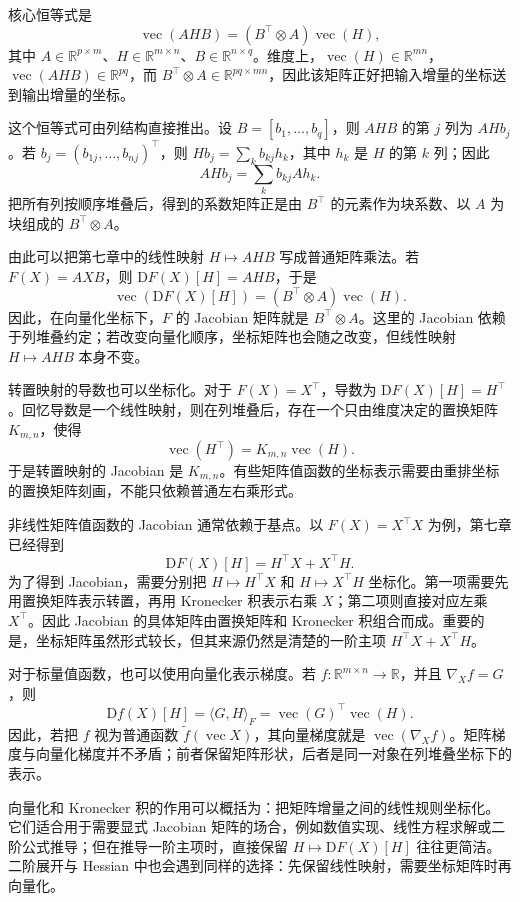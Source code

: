 核心恒等式是
\[
\operatorname{vec}(A H B)=(B^\top\otimes A)\operatorname{vec}(H),
\]
其中 \(A\in\mathbb{R}^{p\times m}\)、\(H\in\mathbb{R}^{m\times n}\)、\(B\in\mathbb{R}^{n\times q}\)。维度上，\(\operatorname{vec}(H)\in\mathbb{R}^{mn}\)，\(\operatorname{vec}(AHB)\in\mathbb{R}^{pq}\)，而 \(B^\top\otimes A\in\mathbb{R}^{pq\times mn}\)，因此该矩阵正好把输入增量的坐标送到输出增量的坐标。

这个恒等式可由列结构直接推出。设 \(B=[b_1,\ldots,b_q]\)，则 \(AHB\) 的第 \(j\) 列为 \(AHb_j\)。若 \(b_j=(b_{1j},\ldots,b_{nj})^\top\)，则 \(Hb_j=\sum_k b_{kj}h_k\)，其中 \(h_k\) 是 \(H\) 的第 \(k\) 列；因此
\[
AHb_j=\sum_k b_{kj}A h_k.
\]
把所有列按顺序堆叠后，得到的系数矩阵正是由 \(B^\top\) 的元素作为块系数、以 \(A\) 为块组成的 \(B^\top\otimes A\)。

由此可以把第七章中的线性映射 \(H\mapsto AHB\) 写成普通矩阵乘法。若 \(F(X)=AXB\)，则 \(\mathrm{D}F(X)[H]=AHB\)，于是
\[
\operatorname{vec}(\mathrm{D}F(X)[H])=(B^\top\otimes A)\operatorname{vec}(H).
\]
因此，在向量化坐标下，\(F\) 的 Jacobian 矩阵就是 \(B^\top\otimes A\)。这里的 Jacobian 依赖于列堆叠约定；若改变向量化顺序，坐标矩阵也会随之改变，但线性映射 \(H\mapsto AHB\) 本身不变。

转置映射的导数也可以坐标化。对于 \(F(X)=X^\top\)，导数为 \(\mathrm{D}F(X)[H]=H^\top\)。回忆导数是一个线性映射，则在列堆叠后，存在一个只由维度决定的置换矩阵 \(K_{m,n}\)，使得
\[
\operatorname{vec}(H^\top)=K_{m,n}\operatorname{vec}(H).
\]
于是转置映射的 Jacobian 是 \(K_{m,n}\)。有些矩阵值函数的坐标表示需要由重排坐标的置换矩阵刻画，不能只依赖普通左右乘形式。

非线性矩阵值函数的 Jacobian 通常依赖于基点。以 \(F(X)=X^\top X\) 为例，第七章已经得到
\[
\mathrm{D}F(X)[H]=H^\top X+X^\top H.
\]
为了得到 Jacobian，需要分别把 \(H\mapsto H^\top X\) 和 \(H\mapsto X^\top H\) 坐标化。第一项需要先用置换矩阵表示转置，再用 Kronecker 积表示右乘 \(X\)；第二项则直接对应左乘 \(X^\top\)。因此 Jacobian 的具体矩阵由置换矩阵和 Kronecker 积组合而成。重要的是，坐标矩阵虽然形式较长，但其来源仍然是清楚的一阶主项 \(H^\top X+X^\top H\)。

对于标量值函数，也可以使用向量化表示梯度。若 \(f:\mathbb{R}^{m\times n}\to\mathbb{R}\)，并且 \(\nabla_X f=G\)，则
\[
\mathrm{D}f(X)[H]=\langle G,H\rangle_F=\operatorname{vec}(G)^\top\operatorname{vec}(H).
\]
因此，若把 \(f\) 视为普通函数 \(\tilde f(\operatorname{vec}X)\)，其向量梯度就是 \(\operatorname{vec}(\nabla_X f)\)。矩阵梯度与向量化梯度并不矛盾；前者保留矩阵形状，后者是同一对象在列堆叠坐标下的表示。

向量化和 Kronecker 积的作用可以概括为：把矩阵增量之间的线性规则坐标化。它们适合用于需要显式 Jacobian 矩阵的场合，例如数值实现、线性方程求解或二阶公式推导；但在推导一阶主项时，直接保留 \(H\mapsto \mathrm{D}F(X)[H]\) 往往更简洁。二阶展开与 Hessian 中也会遇到同样的选择：先保留线性映射，需要坐标矩阵时再向量化。
